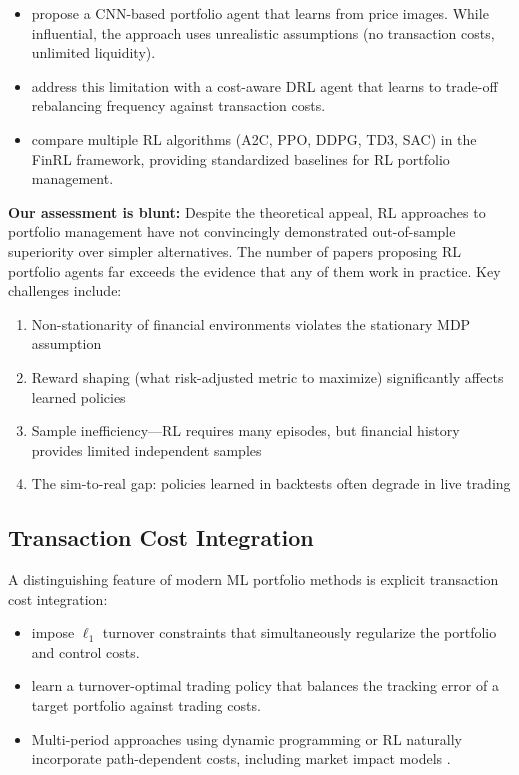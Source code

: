 \begin{itemize}[leftmargin=*]
    \item \citet{Jiang2017} propose a CNN-based portfolio agent that learns from price images. While influential, the approach uses unrealistic assumptions (no transaction costs, unlimited liquidity).
    \item \citet{Ye2020} address this limitation with a cost-aware DRL agent that learns to trade-off rebalancing frequency against transaction costs.
    \item \citet{Wang2021} compare multiple RL algorithms (A2C, PPO, DDPG, TD3, SAC) in the FinRL framework, providing standardized baselines for RL portfolio management.
\end{itemize}

\textbf{Our assessment is blunt:} Despite the theoretical appeal, RL approaches to portfolio management have not convincingly demonstrated out-of-sample superiority over simpler alternatives. The number of papers proposing RL portfolio agents far exceeds the evidence that any of them work in practice. Key challenges include:
\begin{enumerate}[leftmargin=*]
    \item Non-stationarity of financial environments violates the stationary MDP assumption
    \item Reward shaping (what risk-adjusted metric to maximize) significantly affects learned policies
    \item Sample inefficiency---RL requires many episodes, but financial history provides limited independent samples
    \item The sim-to-real gap: policies learned in backtests often degrade in live trading
\end{enumerate}

\subsection{Transaction Cost Integration}

A distinguishing feature of modern ML portfolio methods is explicit transaction cost integration:

\begin{itemize}[leftmargin=*]
    \item \citet{DeMiguel2020} impose $\ell_1$ turnover constraints that simultaneously regularize the portfolio and control costs.
    \item \citet{Moallemi2023} learn a turnover-optimal trading policy that balances the tracking error of a target portfolio against trading costs.
    \item Multi-period approaches using dynamic programming or RL naturally incorporate path-dependent costs, including market impact models \citep{Almgren2001}.
\end{itemize}
